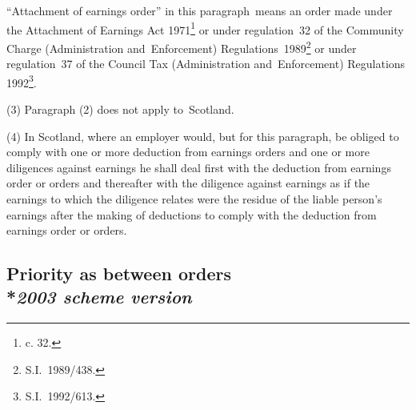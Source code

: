 \documentclass[12pt,a4paper]{article}
\begin{document}
“Attachment of earnings order” in this paragraph~means an order made under the Attachment of Earnings Act 1971\footnote{ c. 32.} or under regulation~32 of the Community Charge (Administration and~Enforcement) Regulations~1989\footnote{\frenchspacing S.I.~1989/438.}
or under regulation~37 of the Council Tax (Administration and~Enforcement) Regulations 1992\footnote{\frenchspacing  S.I.~1992/613.}. %

(3) Paragraph (2) does not apply to~Scotland.

(4) In Scotland, where an employer would, but for this paragraph, be obliged to comply with one or more deduction from earnings orders and one or more diligences against earnings he shall deal first with the deduction from earnings order or orders and thereafter with the diligence against earnings as if the earnings to which the diligence relates were the residue of the liable person’s earnings after the making of deductions to comply with the deduction from earnings order or orders.


\subsection[24. Priority as between orders --- \emph{2003 scheme version}]{Priority as between orders\\*\emph{2003 scheme version}}
\end{document}
